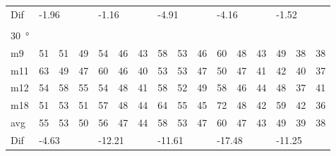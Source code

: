 \begin{table}[H]
\begin{tabular}{l|l|l|l|l|l|l|l|l|l|l|l|l|lll}
Dif & \multicolumn{3}{l|}{-1.96} & \multicolumn{3}{l|}{-1.16} & \multicolumn{3}{l|}{-4.91} & \multicolumn{3}{l|}{-4.16} & \multicolumn{3}{l}{-1.52}  \\ 
 \multicolumn{16}{l}{ } \\                         
\SI{30}{\degree}   & \multicolumn{3}{l|}{} & \multicolumn{3}{l|}{} & \multicolumn{3}{l|}{} & \multicolumn{3}{l|}{} & \multicolumn{3}{l}{}   \\  \hline
m9    &  51    &  51    &  49    &  54    &  46    &   43   &  58    &   53    &  46    &   60    &   48   &   43   & \multicolumn{1}{l|}{49} & \multicolumn{1}{l|}{38} & 38 \\
m11  &  63    &  49    &  47    &   60   &   46   &   40   &  53    &   53    &  47    &    50   &   47   &  41   & \multicolumn{1}{l|}{42} & \multicolumn{1}{l|}{40} & 37 \\
m12  &  54    &   58   &  55    &  54    &   48   &   41   &   58   &  52     &   49   &    58   &   46   &   44   & \multicolumn{1}{l|}{48} & \multicolumn{1}{l|}{37} & 41 \\
m18  &  51    &   53   &  51    &   57   &  48    &   44   &   64   &   55    &  45    &    72   &  48    &   42   & \multicolumn{1}{l|}{59} & \multicolumn{1}{l|}{42} & 36 \\ \hline
avg &  55    &  53    &  50    &  56    & 47     &  44    &   58   &  53     &  47    &  60     &   47   &  43    & \multicolumn{1}{l|}{49} & \multicolumn{1}{l|}{39}  & 38 \\ \hline  
Dif & \multicolumn{3}{l|}{-4.63} & \multicolumn{3}{l|}{-12.21} & \multicolumn{3}{l|}{-11.61} & \multicolumn{3}{l|}{-17.48} & \multicolumn{3}{l}{-11.25}                                
\end{tabular}
\end{table}


